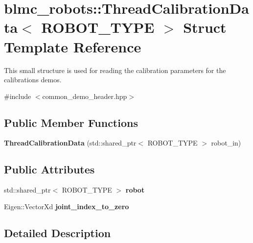 \hypertarget{structblmc__robots_1_1ThreadCalibrationData}{}\section{blmc\+\_\+robots\+:\+:Thread\+Calibration\+Data$<$ R\+O\+B\+O\+T\+\_\+\+T\+Y\+PE $>$ Struct Template Reference}
\label{structblmc__robots_1_1ThreadCalibrationData}


This small structure is used for reading the calibration parameters for the calibrations demos.  




{\ttfamily \#include $<$common\+\_\+demo\+\_\+header.\+hpp$>$}

\subsection*{Public Member Functions}
\begin{DoxyCompactItemize}
\item 
\mbox{\label{structblmc__robots_1_1ThreadCalibrationData_a3529e99623e721c298aaf130e5f5c532}} 
{\bfseries Thread\+Calibration\+Data} (std\+::shared\+\_\+ptr$<$ R\+O\+B\+O\+T\+\_\+\+T\+Y\+PE $>$ robot\+\_\+in)
\end{DoxyCompactItemize}
\subsection*{Public Attributes}
\begin{DoxyCompactItemize}
\item 
\mbox{\label{structblmc__robots_1_1ThreadCalibrationData_ad2ab54755b5ab44f04deeea643d65c75}} 
std\+::shared\+\_\+ptr$<$ R\+O\+B\+O\+T\+\_\+\+T\+Y\+PE $>$ {\bfseries robot}
\item 
\mbox{\label{structblmc__robots_1_1ThreadCalibrationData_ac76287dbb3e693f78b4ea68e6164feb7}} 
Eigen\+::\+Vector\+Xd {\bfseries joint\+\_\+index\+\_\+to\+\_\+zero}
\end{DoxyCompactItemize}


\subsection{Detailed Description}
